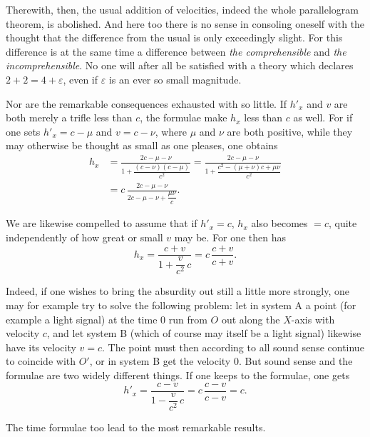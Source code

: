 \documentclass[12pt,a4paper]{article}
\begin{document}
Therewith, then, the usual addition of velocities, indeed the whole
parallelogram theorem, is abolished. And here too there is no sense in
consoling oneself with the thought that the difference from the usual is only
exceedingly slight. For this difference is at the same time a difference
between \emph{the comprehensible} and \emph{the incomprehensible}. No one will
after all be satisfied with a theory which declares
$2 + 2 = 4 + \varepsilon$, even if $\varepsilon$ is an ever so small
magnitude.

Nor are the remarkable consequences exhausted with so little. If $h'_{x}$ and
$v$ are both merely a trifle less than $c$, the formulae make $h_{x}$ less
than $c$ as well. For if one sets $h'_{x} = c - \mu$ and $v = c - \nu$, where
$\mu$ and $\nu$ are both positive, while they may otherwise be thought as
small as one pleases, one obtains
\begin{align*}
  h_{x} &= \frac{2c - \mu - \nu}{1 + \dfrac{(c - \nu)(c - \mu)}{c^{2}}}
         = \frac{2c - \mu - \nu}{1
           + \dfrac{c^{2} - (\mu + \nu)c + \mu\nu}{c^{2}}}\\
        &= c\,\frac{2c - \mu - \nu}{2c - \mu - \nu + \dfrac{\mu\nu}{c}}.
\end{align*}

We are likewise compelled to assume that if $h'_{x} = c$, $h_{x}$ also becomes
$= c$, quite independently of how great or small $v$ may be. For one then has
\[
  h_{x} = \frac{c + v}{1 + \dfrac{v}{c^{2}}\,c} = c\,\frac{c + v}{c + v}.
\]

Indeed, if one wishes to bring the absurdity out still a little more strongly,
one may for example try to solve the following problem: let in system A a
point (for example a light signal) at the time 0 run from $O$ out along the
$X$-axis with velocity $c$, and let system B (which of course may itself be a
light signal) likewise have its velocity $v = c$. The point must then
according to all sound
sense continue to coincide with $O'$, or in system B get the velocity 0. But
sound sense and the formulae are two widely different things. If one keeps to
the formulae, one gets
\[
  h'_{x} = \frac{c - v}{1 - \dfrac{v}{c^{2}}\,c} = c\,\frac{c - v}{c - v} = c.
\]

The time formulae too lead to the most remarkable results.
\end{document}
